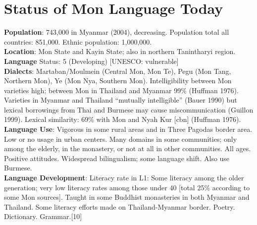 \documentclass[conference]{IEEEtran}
\begin{document}
\section{Status of Mon Language Today}
\noindent \textbf {Population}: 743,000 in Myanmar (2004), decreasing. Population total all countries: 851,000.
Ethnic population: 1,000,000. \\
\noindent \textbf {Location}: Mon State and Kayin State; also in northern Tanintharyi region. \\
\noindent \textbf {Language} Status: 5 (Developing) [UNESCO: vulnerable] \\
\noindent \textbf {Dialects}: Martaban/Moulmein (Central Mon, Mon Te), Pegu (Mon Tang, Northern Mon), Ye
(Mon Nya, Southern Mon). Intelligibility between Mon varieties high; between Mon in Thailand and Myanmar 99\% (Huffman 1976). Varieties in Myanmar and Thailand “mutually intelligible” (Bauer 1990) but lexical borrowings from Thai and Burmese may cause miscommunication (Guillon 1999). Lexical similarity: 69\% with Mon and Nyah Kur [cbn] (Huffman 1976). \\
\noindent \textbf {Language Use}: Vigorous in some rural areas and in Three Pagodas border area. Low or no
usage in urban centers. Many domains in some communities; only among the elderly, in the monastery, or not at all in other communities. All ages. Positive attitudes. Widespread bilingualism; some language shift. Also use Burmese. \\
\noindent \textbf {Language Development}: Literacy rate in L1: Some literacy among the older generation; very
low literacy rates among those under 40 [total 25\% according to some Mon sources]. Taught in some Buddhist monasteries in both Myanmar and Thailand. Some literacy efforts made on Thailand-Myanmar border. Poetry. Dictionary. Grammar.[10]
\end{document}
